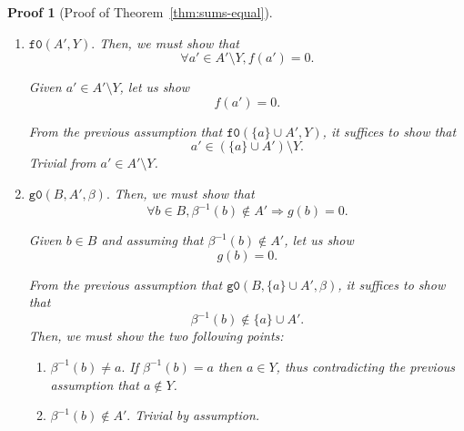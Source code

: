 \documentclass[pdflatex,sn-mathphys]{sn-jnl}%
\theoremstyle{thmstyleone}%
\theoremstyle{thmstyletwo}%
\newtheorem*{pf}{Proof}%
\theoremstyle{thmstylethree}%
\begin{document}
\begin{appendices}
\begin{pf}[Proof of Theorem~\ref{thm:sums-equal}]
\begin{enumerate}
\begin{enumerate}
\begin{enumerate}
           \item $\boxed{\mathtt{f0}(A',Y).}$ Then, we must show that
             \begin{equation*}
               \boxed{\forall{}a'\in{}A'\setminus{}Y,f(a')=0.}
             \end{equation*}

             Given $a'\in{}A'\setminus{}Y$, let us show
             \begin{equation*}
               \boxed{f(a')=0.}
             \end{equation*}

             From the previous assumption that
             $\mathtt{f0}(\{a\}\cup{}A',Y)$, it suffices to show that
             \begin{equation*}
               \boxed{a'\in(\{a\}\cup{}A')\setminus{}Y.}
             \end{equation*}
             Trivial from $a'\in{}A'\setminus{}Y$.
             
           \item $\boxed{\mathtt{g0}(B,A',\beta).}$ Then, we must show
             that
             \begin{equation*}
               \boxed{\forall{}b\in{}B,\beta^{-1}(b)\notin{}A'\Rightarrow{}g(b)=0.}
             \end{equation*}

             Given $b\in{}B$ and assuming that
             $\beta^{-1}(b)\notin{}A'$, let us show
             \begin{equation*}
               \boxed{g(b)=0.}
             \end{equation*}

             From the previous assumption that
             $\mathtt{g0}(B,\{a\}\cup{}A',\beta)$, it suffices to show that
             \begin{equation*}
               \boxed{\beta^{-1}(b)\notin{}\{a\}\cup{}A'.}
             \end{equation*}
             Then, we must show the two following points:
             \begin{enumerate}
             \item $\boxed{\beta^{-1}(b)\neq{}a.}$ If $\beta^{-1}(b)=a$
               then $a\in{}Y$, thus contradicting the previous
               assumption that $a\notin{}Y$.
             \item $\boxed{\beta^{-1}(b)\notin{}A'.}$ Trivial by
               assumption.
             \end{enumerate}
           \end{enumerate}
           
         \end{enumerate}
       \end{enumerate}
       
     \end{pf}

  
\end{appendices}
\end{document}
